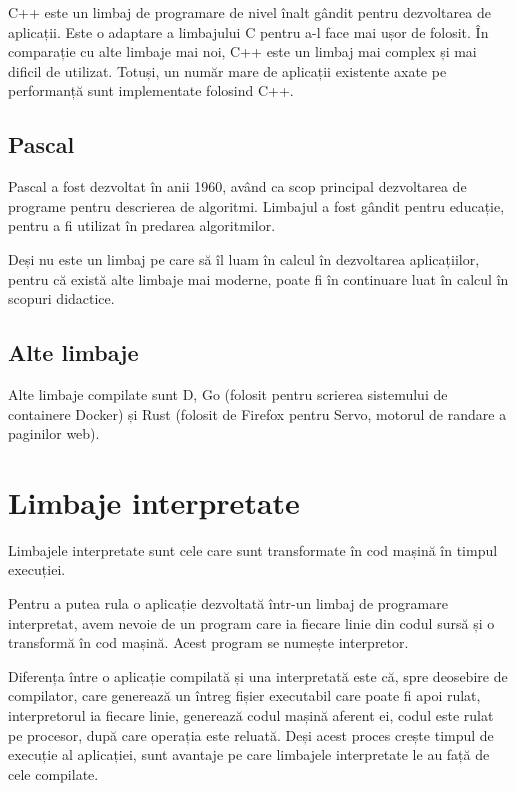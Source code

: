 C++ este un limbaj de programare de nivel înalt gândit pentru dezvoltarea de
aplicații. Este o adaptare a limbajului C pentru a-l face mai ușor de folosit.
În comparație cu alte limbaje mai noi, C++ este un limbaj mai complex și mai dificil de
utilizat. Totuși, un număr mare de aplicații existente axate pe performanță sunt implementate folosind C++.

\subsection{Pascal}
\label{sec:appdev:compiled-lang:pascal}

Pascal a fost dezvoltat în anii 1960, având ca scop principal dezvoltarea de
programe pentru descrierea de algoritmi. Limbajul a fost gândit pentru educație,
pentru a fi utilizat în predarea algoritmilor.

Deși nu este un limbaj pe care să îl luam în calcul în dezvoltarea aplicațiilor,
pentru că există alte limbaje mai moderne, poate fi în continuare luat în calcul
în scopuri didactice.

\subsection{Alte limbaje}
\label{sec:appdev:compiled-lang:other}

Alte limbaje compilate sunt D, Go (folosit pentru scrierea sistemului de
containere Docker) și Rust (folosit de Firefox pentru Servo, motorul de randare
a paginilor web).

\section{Limbaje interpretate}
\label{sec:appdev-langs-int}

Limbajele interpretate sunt cele care sunt transformate în cod mașină în timpul
execuției.

Pentru a putea rula o aplicație dezvoltată într-un limbaj de programare
interpretat, avem nevoie de un program care ia fiecare linie din codul sursă și
o transformă în cod mașină. Acest program se numește interpretor.

Diferența între o aplicație compilată și una interpretată este că, spre deosebire
de compilator, care generează un întreg fișier executabil care poate fi apoi
rulat, interpretorul ia fiecare linie, generează codul mașină aferent ei, codul
este rulat pe procesor, după care operația este reluată. Deși acest proces
crește timpul de execuție al aplicației, sunt avantaje pe care limbajele
interpretate le au față de cele compilate.

